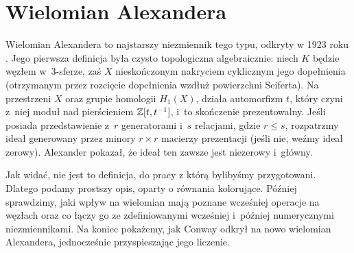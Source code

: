 \section{Wielomian Alexandera}
%

Wielomian Alexandera to najstarszy niezmiennik tego typu, odkryty w 1923 roku \cite{alexander23}.
Jego pierwsza definicja była czysto topologiczna algebraicznie: niech $K$ będzie węzłem w~3-sferze, zaś $X$ nieskończonym nakryciem cyklicznym jego dopełnienia (otrzymanym przez rozcięcie dopełnienia wzdłuż powierzchni Seiferta).
Na przestrzeni $X$ oraz grupie homologii $H_1(X)$, działa automorfizm $t$, który czyni z~niej moduł nad pierścieniem $\mathbb Z[t, t^{-1}]$, i~to skończenie prezentowalny.
Jeśli posiada przedstawienie z~$r$ generatorami i~$s$ relacjami, gdzie $r \le s$, rozpatrzmy ideał generowany przez minory $r \times r$ macierzy prezentacji (jeśli nie, weźmy ideał zerowy).
Alexander pokazał, że ideał ten zawsze jest niezerowy i~główny.

Jak widać, nie jest to definicja, do pracy z którą bylibyśmy przygotowani.
Dlatego podamy prostszy opis, oparty o równania kolorujące.
Później sprawdzimy, jaki wpływ na wielomian mają poznane wcześniej operacje na węzłach oraz co łączy go ze zdefiniowanymi wcześniej i~później numerycznymi niezmiennikami.
Na koniec pokażemy, jak Conway odkrył na nowo wielomian Alexandera, jednocześnie przyspieszając jego liczenie.














